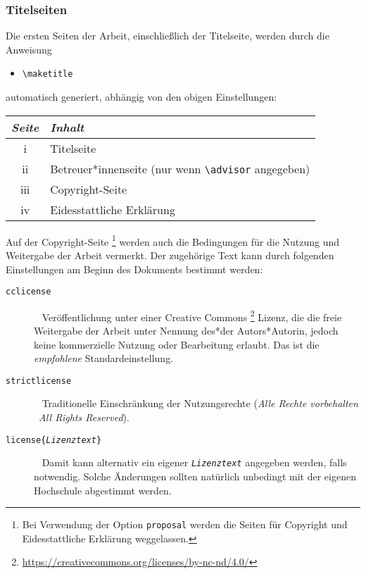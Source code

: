 \subsubsection{Titelseiten}

Die ersten Seiten der Arbeit, einschließlich der Titelseite, werden durch die
Anweisung
%
\begin{itemize}
    \item[] \verb!\maketitle!
\end{itemize}
%
automatisch generiert, abhängig von den obigen Einstellungen:
%
\begin{center}
    \begin{tabular}{@{}cl@{}}
        \toprule
        \emph{Seite} & \emph{Inhalt} \\
        \midrule
        \textrm{i}   & Titelseite \\
        \textrm{ii}  & Betreuer*innenseite (nur wenn \verb!\advisor!
                       angegeben) \\
        \textrm{iii} & Copyright-Seite\\
        \textrm{iv}  & Eidesstattliche Erklärung\\
        \bottomrule
    \end{tabular}
\end{center}
%
Auf der Copyright-Seite%
\footnote{Bei Verwendung der Option \texttt{proposal} werden die Seiten für Copyright und 
Eidesstattliche Erklärung weggelassen.}
werden auch die Bedingungen für die Nutzung und
Weitergabe der Arbeit vermerkt. Der zugehörige Text kann durch folgenden
Einstellungen am Beginn des Dokuments bestimmt werden:
%
\begin{description}
    \item[\normalfont\texttt{{\bs}cclicense}] ~ \newline
    Veröffentlichung unter einer Creative Commons%
    \footnote{\url{https://creativecommons.org/licenses/by-nc-nd/4.0/}}
    Lizenz, die die freie Weitergabe der Arbeit unter Nennung des*der
    Autors*Autorin, jedoch keine kommerzielle Nutzung oder Bearbeitung erlaubt.
    Das ist die \emph{empfohlene} Standardeinstellung.
    \item[\normalfont\texttt{{\bs}strictlicense}] ~ \newline
    Traditionelle Einschränkung der Nutzungsrechte
    (\emph{Alle Rechte vorbehalten} \bzw\ \emph{All Rights Reserved}).
    \item[\normalfont\texttt{{\bs}license\{\emph{Lizenztext}\}}] ~ \newline
    Damit kann alternativ ein eigener \texttt{\emph{Lizenztext}} angegeben
    werden, falls notwendig. Solche Änderungen sollten natürlich unbedingt
    mit der eigenen Hochschule abgestimmt werden.
\end{description}

